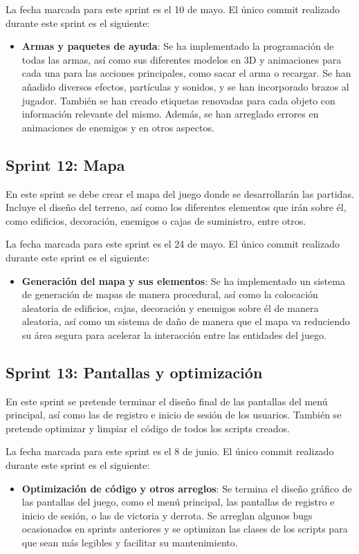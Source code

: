 La fecha marcada para este sprint es el 10 de mayo. El único commit realizado durante este sprint es el siguiente:
\begin{itemize}
    \item \textbf{Armas y paquetes de ayuda}: Se ha implementado la programación de todas las armas, así como sus diferentes modelos en 3D y animaciones para cada una para las acciones principales, como sacar el arma o recargar. Se han añadido diversos efectos, partículas y sonidos, y se han incorporado brazos al jugador. También se han creado etiquetas renovadas para cada objeto con información relevante del mismo. Además, se han arreglado errores en animaciones de enemigos y en otros aspectos.
\end{itemize}
\subsection{Sprint 12: Mapa}
En este sprint se debe crear el mapa del juego donde se desarrollarán las partidas. Incluye el diseño del terreno, así como los diferentes elementos que irán sobre él, como edificios, decoración, enemigos o cajas de suministro, entre otros.

La fecha marcada para este sprint es el 24 de mayo. El único commit realizado durante este sprint es el siguiente:
\begin{itemize}
    \item \textbf{Generación del mapa y sus elementos}: Se ha implementado un sistema de generación de mapas de manera procedural, así como la colocación aleatoria de edificios, cajas, decoración y enemigos sobre él de manera aleatoria, así como un sistema de daño de manera que el mapa va reduciendo su área segura para acelerar la interacción entre las entidades del juego.
\end{itemize}
\subsection{Sprint 13: Pantallas y optimización}
En este sprint se pretende terminar el diseño final de las pantallas del menú principal, así como las de registro e inicio de sesión de los usuarios. También se pretende optimizar y limpiar el código de todos los scripts creados.

La fecha marcada para este sprint es el 8 de junio. El único commit realizado durante este sprint es el siguiente:

\begin{itemize}
    \item \textbf{Optimización de código y otros arreglos}: Se termina el diseño gráfico de las pantallas del juego, como el menú principal, las pantallas de registro e inicio de sesión, o las de victoria y derrota. Se arreglan algunos bugs ocasionados en sprints anteriores y se optimizan las clases de los scripts para que sean más legibles y facilitar su mantenimiento.
\end{itemize}

